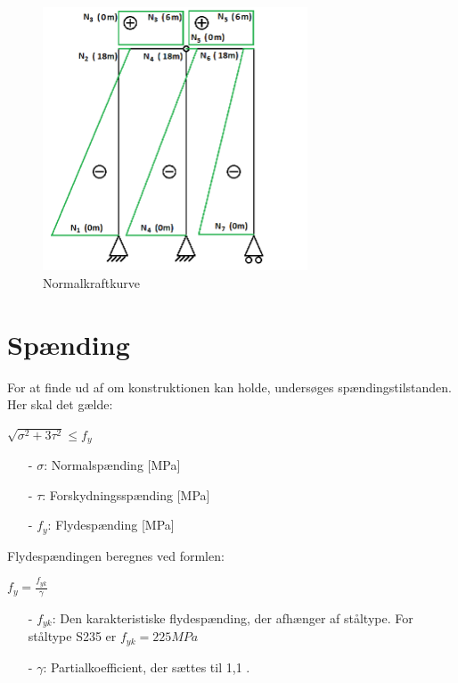 \begin{figure}[H]
	\centering
	\includegraphics[width=0.7\textwidth]{billeder/SKFN.png}
	\caption{Normalkraftkurve}
	\label{fig:normalkraftkurve}
\end{figure}

\section{Spænding}
For at finde ud af om konstruktionen kan holde, undersøges spændingstilstanden. Her skal det gælde:

\begin{center}
	$\sqrt{\sigma^2 + 3\tau^2} \le f_y$ 
\end{center}

\begin{itemize}
	\item[-] $\sigma$: Normalspænding [MPa]
	\item[-] $\tau$: Forskydningsspænding [MPa]
	\item[-] $f_y$: Flydespænding [MPa]
\end{itemize}

Flydespændingen beregnes ved formlen:

\begin{center}
	$f_y = \frac{f_{yk}}{\gamma}$
\end{center}

\begin{itemize}
	\item[-] $f_{yk}$: Den karakteristiske flydespænding, der afhænger af ståltype. For ståltype S235 er $f_{yk} = 225 MPa$
	\item[-] $\gamma$: Partialkoefficient, der sættes til 1,1 \citep[ s. 212]{stabi}.  
\end{itemize}


